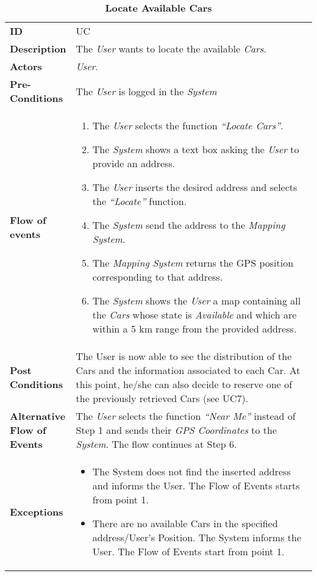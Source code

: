 \begin{longtable}{|p{0.2\linewidth} | p{0.8\linewidth}|}
	\captionsetup{labelformat=empty} %
	\caption{\textbf{Locate Available Cars}} %
	\label{UC_LocateCars}%
	\\ \hline %
	
	\textbf{ID} & UC\theUseCaseIdCounter \\ \hline
	\textbf{Description} & The \emph{User} wants to locate the available \emph{Cars}. \\ \hline
	\textbf{Actors} & \emph{User}.\\ \hline
	\textbf{Pre-Conditions} & The \emph{User} is logged in the \emph{System} \\ \hline
	\textbf{Flow of events} & 
	\begin{enumerate}
		\item The \emph{User} selects the function \textit{\textquotedblleft{Locate Cars}\textquotedblright}.
		\item The \emph{System} shows a text box asking the \emph{User} to provide an address.
		\item The \emph{User} inserts the desired address and selects the \textit{\textquotedblleft{Locate}\textquotedblright} function.
		\item The \emph{System} send the address to the \emph{Mapping System}.
		\item The \emph{Mapping System} returns the GPS position corresponding to that address.
		\item The \emph{System} shows the \emph{User} a map containing all the \emph{Cars} whose state is \textit{Available} and which are within a 5 km range from the provided address. 
	\end{enumerate}	 \\ \hline
	\textbf{Post Conditions} & The User is now able to see the distribution of the Cars and the information associated to each Car. At this point, he/she can also decide to reserve one of the previously retrieved Cars (see UC7).\\ \hline
	\textbf{Alternative Flow of Events} & The \emph{User} selects the function \textit{\textquotedblleft{Near Me}\textquotedblright} instead of Step 1 and sends their \emph{GPS Coordinates} to the \emph{System}. The flow continues at Step 6. \\ \hline
	\textbf{Exceptions} & 
	\begin{itemize}
		\item The System does not find the inserted address and informs the User. The Flow of Events starts from point 1.
		\item There are no available Cars in the specified address/User's Position. The System informs the User. The Flow of Events start from point 1.
	\end{itemize} \\ \hline
\end{longtable}


